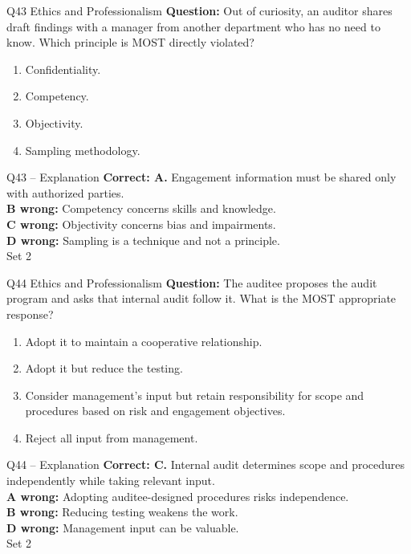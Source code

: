 \documentclass[aspectratio=169,10pt]{beamer}
\begin{document}
\begin{frame}[t]{Q43 \hfill {\scriptsize Ethics and Professionalism}}
	\small
	\textbf{Question:} Out of curiosity, an auditor shares draft findings with a manager from another department who has no need to know. Which principle is MOST directly violated?
	\begin{enumerate}[label=\Alph*.,itemsep=1pt,topsep=3pt]
			\item Confidentiality.
			\item Competency.
			\item Objectivity.
			\item Sampling methodology.
	\end{enumerate}
\end{frame}

\begin{frame}[t]{Q43 -- Explanation}
	\footnotesize
	\textbf{Correct: A.} Engagement information must be shared only with authorized parties. \\[5pt]
\textbf{B wrong:} Competency concerns skills and knowledge. \\[3pt]
\textbf{C wrong:} Objectivity concerns bias and impairments. \\[3pt]
\textbf{D wrong:} Sampling is a technique and not a principle. \\[3pt]
	\vfill {\tiny Set 2}
\end{frame}

\begin{frame}[t]{Q44 \hfill {\scriptsize Ethics and Professionalism}}
	\small
	\textbf{Question:} The auditee proposes the audit program and asks that internal audit follow it. What is the MOST appropriate response?
	\begin{enumerate}[label=\Alph*.,itemsep=1pt,topsep=3pt]
			\item Adopt it to maintain a cooperative relationship.
			\item Adopt it but reduce the testing.
			\item Consider management's input but retain responsibility for scope and procedures based on risk and engagement objectives.
			\item Reject all input from management.
	\end{enumerate}
\end{frame}

\begin{frame}[t]{Q44 -- Explanation}
	\footnotesize
	\textbf{Correct: C.} Internal audit determines scope and procedures independently while taking relevant input. \\[5pt]
\textbf{A wrong:} Adopting auditee-designed procedures risks independence. \\[3pt]
\textbf{B wrong:} Reducing testing weakens the work. \\[3pt]
\textbf{D wrong:} Management input can be valuable. \\[3pt]
	\vfill {\tiny Set 2}
\end{frame}
\end{document}
